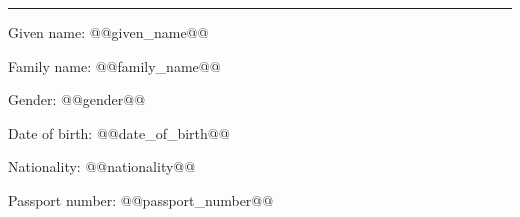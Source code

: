 \vspace{5pt}
\hrule
\vspace{5pt}
\noindent Given name: @@given_name@@

\noindent Family name: @@family_name@@

\noindent Gender: @@gender@@

\noindent Date of birth: @@date_of_birth@@

\noindent Nationality: @@nationality@@

\noindent Passport number: @@passport_number@@
